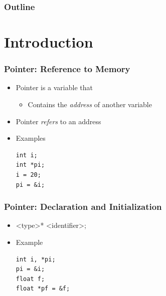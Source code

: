 \documentclass{../c-lecture}
\subtitle{Pointers \& Dynamic Memory}
\begin{document}
\begin{frame}
  \titlepage{}
\end{frame}
\begin{frame}
  \frametitle{Outline}
  \tableofcontents{}
\end{frame}

\section{Introduction}

\begin{frame}[fragile]
  \frametitle{Pointer: Reference to Memory}
  \begin{itemize}
    \item Pointer is a variable that
    \begin{itemize}
      \item
        Contains the \textit{\color{Orange} address} of another variable
    \end{itemize}
    \item Pointer \textit{\color{LimeGreen} refers} to an address
    \item Examples
    \begin{verbatim}
int i;
int *pi;
i = 20;
pi = &i;
    \end{verbatim}
  \end{itemize}
\end{frame}

\begin{frame}[fragile]
  \frametitle{Pointer: Declaration and Initialization}
  \begin{itemize}
    \item
      {\color{Orange}<type>}*
      {\color{LimeGreen}<identifier>};
    \item Example
    \begin{verbatim}
int i, *pi;
pi = &i;
float f;
float *pf = &f;
    \end{verbatim}
  \end{itemize}
\end{frame}
\end{document}
